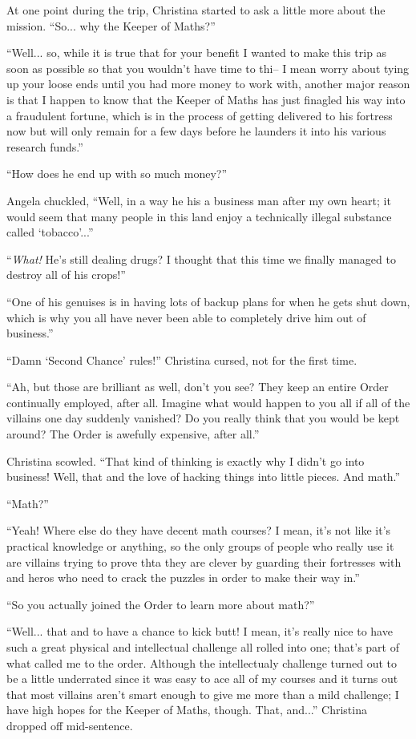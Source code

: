 \documentclass[showtrims,b6paper,draft,10pt]{memoir}
\begin{document}
At one point during the trip, Christina started to ask a little more about the mission.  ``So... why the Keeper of Maths?''

``Well... so, while it is true that for your benefit I wanted to make this trip as soon as possible so that you wouldn't have time to thi-- I mean worry about tying up your loose ends until you had more money to work with, another major reason is that I happen to know that the Keeper of Maths has just finagled his way into a fraudulent fortune, which is in the process of getting delivered to his fortress now but will only remain for a few days before he launders it into his various research funds.''

``How does he end up with so much money?''

Angela chuckled, ``Well, in a way he his a business man after my own heart;  it would seem that many people in this land enjoy a technically illegal substance called `tobacco'...''

``\emph{What!}  He's still dealing drugs?  I thought that this time we finally managed to destroy all of his crops!''

``One of his genuises is in having lots of backup plans for when he gets shut down, which is why you all have never been able to completely drive him out of business.''

``Damn `Second Chance' rules!'' Christina cursed, not for the first time.

``Ah, but those are brilliant as well, don't you see?  They keep an entire Order continually employed, after all.  Imagine what would happen to you all if all of the villains one day suddenly vanished?  Do you really think that you would be kept around?  The Order is awefully expensive, after all.''

Christina scowled.  ``That kind of thinking is exactly why I didn't go into business!  Well, that and the love of hacking things into little pieces.  And math.''

``Math?''

``Yeah!  Where else do they have decent math courses?  I mean, it's not like it's practical knowledge or anything, so the only groups of people who really use it are villains trying to prove thta they are clever by guarding their fortresses with and heros who need to crack the puzzles in order to make their way in.''

``So you actually joined the Order to learn more about math?''

``Well... that and to have a chance to kick butt!  I mean, it's really nice to have such a great physical and intellectual challenge all rolled into one; that's part of what called me to the order.  Although the intellectualy challenge turned out to be a little underrated since it was easy to ace all of my courses and it turns out that most villains aren't smart enough to give me more than a mild challenge;  I have high hopes for the Keeper of Maths, though.  That, and...''  Christina dropped off mid-sentence.
\end{document}
